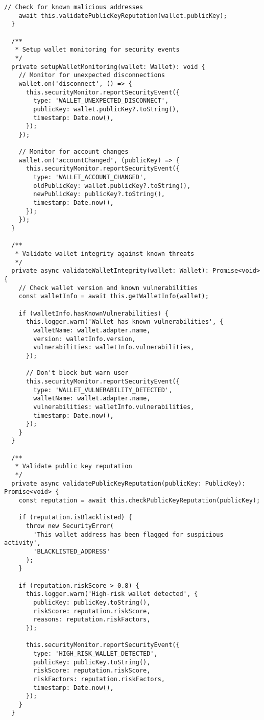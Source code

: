 \documentclass[11pt,a4paper]{article}
\begin{document}
\begin{lstlisting}[style=typescript, caption=Secure Wallet Provider Implementation]
    // Check for known malicious addresses
    await this.validatePublicKeyReputation(wallet.publicKey);
  }

  /**
   * Setup wallet monitoring for security events
   */
  private setupWalletMonitoring(wallet: Wallet): void {
    // Monitor for unexpected disconnections
    wallet.on('disconnect', () => {
      this.securityMonitor.reportSecurityEvent({
        type: 'WALLET_UNEXPECTED_DISCONNECT',
        publicKey: wallet.publicKey?.toString(),
        timestamp: Date.now(),
      });
    });

    // Monitor for account changes
    wallet.on('accountChanged', (publicKey) => {
      this.securityMonitor.reportSecurityEvent({
        type: 'WALLET_ACCOUNT_CHANGED',
        oldPublicKey: wallet.publicKey?.toString(),
        newPublicKey: publicKey?.toString(),
        timestamp: Date.now(),
      });
    });
  }

  /**
   * Validate wallet integrity against known threats
   */
  private async validateWalletIntegrity(wallet: Wallet): Promise<void> {
    // Check wallet version and known vulnerabilities
    const walletInfo = await this.getWalletInfo(wallet);
    
    if (walletInfo.hasKnownVulnerabilities) {
      this.logger.warn('Wallet has known vulnerabilities', {
        walletName: wallet.adapter.name,
        version: walletInfo.version,
        vulnerabilities: walletInfo.vulnerabilities,
      });

      // Don't block but warn user
      this.securityMonitor.reportSecurityEvent({
        type: 'WALLET_VULNERABILITY_DETECTED',
        walletName: wallet.adapter.name,
        vulnerabilities: walletInfo.vulnerabilities,
        timestamp: Date.now(),
      });
    }
  }

  /**
   * Validate public key reputation
   */
  private async validatePublicKeyReputation(publicKey: PublicKey): Promise<void> {
    const reputation = await this.checkPublicKeyReputation(publicKey);
    
    if (reputation.isBlacklisted) {
      throw new SecurityError(
        'This wallet address has been flagged for suspicious activity',
        'BLACKLISTED_ADDRESS'
      );
    }

    if (reputation.riskScore > 0.8) {
      this.logger.warn('High-risk wallet detected', {
        publicKey: publicKey.toString(),
        riskScore: reputation.riskScore,
        reasons: reputation.riskFactors,
      });

      this.securityMonitor.reportSecurityEvent({
        type: 'HIGH_RISK_WALLET_DETECTED',
        publicKey: publicKey.toString(),
        riskScore: reputation.riskScore,
        riskFactors: reputation.riskFactors,
        timestamp: Date.now(),
      });
    }
  }


\end{lstlisting}
\end{document}
